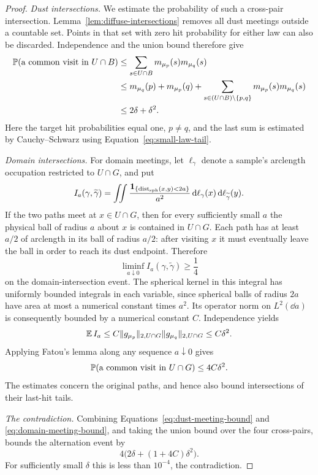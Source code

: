 \begin{proof}


\smallskip\noindent\emph{Dust intersections.}
We estimate the probability of such a cross-pair intersection.
Lemma~\ref{lem:diffuse-intersections} removes all dust meetings outside
a countable set.  Points in that set with zero hit probability for
either law can also be discarded.  Independence and the union bound
therefore give
\begin{align}
 \label{eq:dust-meeting-bound}
 \operatorname{\mathbb P}(\text{a common visit in }U\cap B)
 &\le \sum_{s\in U\cap B}m_{\mu_p}(s)m_{\mu_q}(s)\notag\\
 &\le m_{\mu_q}(p)+m_{\mu_p}(q)
    +\sum_{s\in(U\cap B)\setminus\{p,q\}}
       m_{\mu_p}(s)m_{\mu_q}(s)\notag\\
 &\le 2\delta+\delta^2.
\end{align}
Here the target hit probabilities equal one, $p\ne q$, and the last
sum is estimated by Cauchy--Schwarz using
Equation~\eqref{eq:small-law-tail}.

\smallskip\noindent\emph{Domain intersections.}
For domain meetings, let $\ell_\gamma$ denote a sample's arclength
occupation restricted to $U\cap G$, and put
\[
 I_a(\gamma,\widetilde\gamma)
 =\iint \frac{\mathbf 1_{\{\operatorname{dist}_{\rm sph}(x,y)<2a\}}}{a^2}
       \,\mathrm d\ell_\gamma(x)\,\mathrm d\ell_{\widetilde\gamma}(y).
\]
If the two paths meet at $x\in U\cap G$, then for every sufficiently
small $a$ the physical ball of radius $a$ about $x$ is contained in
$U\cap G$.  Each path has at least $a/2$ of arclength in its ball of
radius $a/2$: after visiting $x$ it must eventually leave the ball in
order to reach its dust endpoint.  Therefore
\[
 \liminf_{a\downarrow0}I_a(\gamma,\widetilde\gamma)\ge\frac14
\]
on the domain-intersection event.  The spherical kernel in this
integral has uniformly bounded integrals in each variable, since
spherical balls of radius $2a$ have area at most a numerical constant
times $a^2$.  Its operator norm on $L^2(\dd a)$ is consequently bounded
by a numerical constant $C$.  Independence yields
\[
 \operatorname{\mathbb E} I_a
 \le C\|g_{\mu_p}\|_{2,U\cap G}
       \|g_{\mu_q}\|_{2,U\cap G}
 \le C\delta^2.
\]
Applying Fatou's lemma along any sequence $a\downarrow0$ gives
\begin{equation}
 \label{eq:domain-meeting-bound}
 \operatorname{\mathbb P}(\text{a common visit in }U\cap G)\le4C\delta^2.
\end{equation}
The estimates concern the original paths, and hence also bound
intersections of their last-hit tails.

\smallskip\noindent\emph{The contradiction.}
Combining Equations~\eqref{eq:dust-meeting-bound} and
\eqref{eq:domain-meeting-bound}, and taking the union bound over the
four cross-pairs, bounds the alternation event by
\[
 4\bigl(2\delta+(1+4C)\delta^2\bigr).
\]
For sufficiently small $\delta$ this is less than $10^{-4}$, the
contradiction.
\end{proof}

